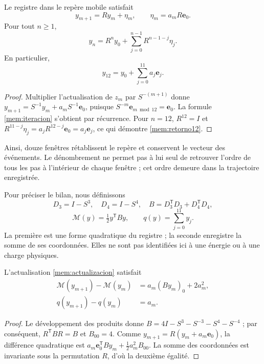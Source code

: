 \begin{proposition}
\label{mem:prop-actualizacion}
Le registre dans le repère mobile satisfait
\begin{equation}
 y_{m+1}=Ry_m+\eta_m,\qquad
 \eta_m=a_mR\mathbf e_0.
 \label{mem:actualizacion}
\end{equation}
Pour tout \(n\geq1\),
\begin{equation}
 y_n=R^ny_0+\sum_{j=0}^{n-1}R^{n-1-j}\eta_j.
 \label{mem:iteracion}
\end{equation}
En particulier,
\begin{equation}
 y_{12}=y_0+\sum_{j=0}^{11}a_j\mathbf e_j.
 \label{mem:retorno12}
\end{equation}
\end{proposition}
\begin{proof}
Multiplier l'actualisation de \(z_m\) par \(S^{-(m+1)}\) donne
\(y_{m+1}=S^{-1}y_m+a_mS^{-1}\mathbf e_0\), puisque
\(S^{-m}\mathbf e_{m\bmod12}=\mathbf e_0\).
La formule \eqref{mem:iteracion} s'obtient par récurrence.
Pour \(n=12\), \(R^{12}=I\) et
\(R^{11-j}\eta_j=a_jR^{12-j}\mathbf e_0=a_j\mathbf e_j\),
ce qui démontre \eqref{mem:retorno12}.
\end{proof}

Ainsi, douze fenêtres rétablissent le repère et conservent le vecteur des événements.
Le dénombrement ne permet pas à lui seul de retrouver l'ordre de tous les pas
à l'intérieur de chaque fenêtre ; cet ordre demeure dans la trajectoire enregistrée.

Pour préciser le bilan, nous définissons
\[
 D_3=I-S^3,\quad D_4=I-S^4,\quad
 B=D_3^{\mathsf T}D_3+D_4^{\mathsf T}D_4,
\]
\[
 \mathcal M(y)=\tfrac12y^{\mathsf T}By,
 \qquad q(y)=\sum_{j=0}^{11}y_j.
\]
La première est une forme quadratique du registre ; la seconde enregistre
la somme de ses coordonnées. Elles ne sont pas identifiées ici à une énergie ou à une charge physiques.

\begin{proposition}
\label{mem:prop-balance}
L'actualisation \eqref{mem:actualizacion} satisfait
\begin{equation}
 \begin{aligned}
 \mathcal M(y_{m+1})-\mathcal M(y_m)
   &=a_m(By_m)_0+2a_m^2,\\
 q(y_{m+1})-q(y_m)&=a_m.
 \end{aligned}
 \label{mem:balance}
\end{equation}
\end{proposition}
\begin{proof}
Le développement des produits donne
\(B=4I-S^3-S^{-3}-S^4-S^{-4}\) ; par conséquent,
\(R^{\mathsf T}BR=B\) et \(B_{00}=4\).
Comme \(y_{m+1}=R(y_m+a_m\mathbf e_0)\), la différence quadratique
est \(a_m\mathbf e_0^{\mathsf T}By_m+\tfrac12a_m^2B_{00}\).
La somme des coordonnées est invariante sous la permutation \(R\),
d'où la deuxième égalité.
\end{proof}

